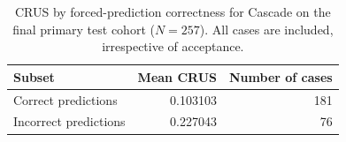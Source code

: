 \begin{table}[ht]
\centering
\caption{CRUS by forced-prediction correctness for Cascade on the final primary test cohort ($N=257$). All cases are included, irrespective of acceptance.}
\label{tab:crus}
\begin{tabular}{lrr}
\hline
Subset & Mean CRUS & Number of cases \\
\hline
Correct predictions & 0.103103 & 181 \\
Incorrect predictions & 0.227043 & 76 \\
\hline
\end{tabular}
\end{table}